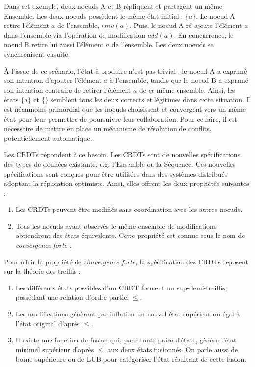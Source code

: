 \documentclass[12pt]{thesul}
\newcommand{\eg}{e.g. }
\newcommand{\trm}[1]{\mathit{#1}}
\begin{document}
Dans cet exemple, deux noeuds A et B répliquent et partagent un même Ensemble.
Les deux noeuds possèdent le même état initial : $\{a\}$.
Le noeud A retire l'élément $a$ de l'ensemble, $\trm{rmv}(a)$.
Puis, le noeud A ré-ajoute l'élément $a$ dans l'ensemble via l'opération de modification $\trm{add}(a)$.
En concurrence, le noeud B retire lui aussi l'élément $a$ de l'ensemble.
Les deux noeuds se synchronisent ensuite.

À l'issue de ce scénario, l'état à produire n'est pas trivial : le noeud A a exprimé son intention d'ajouter l'élément $a$ à l'ensemble, tandis que le noeud B a exprimé son intention contraire de retirer l'élément $a$ de ce même ensemble.
Ainsi, les états $\{a\}$ et $\{\}$ semblent tous les deux corrects et légitimes dans cette situation.
Il est néanmoins primordial que les noeuds choisissent et convergent vers un même état pour leur permettre de poursuivre leur collaboration.
Pour ce faire, il est nécessaire de mettre en place un mécanisme de résolution de conflits, potentiellement automatique.

Les \acp{CRDT} répondent à ce besoin.
Les \acp{CRDT} sont de nouvelles spécifications des types de données existants, \eg l'Ensemble ou la Séquence.
Ces nouvelles spécifications sont conçues pour être utilisées dans des systèmes distribués adoptant la réplication optimiste.
Ainsi, elles offrent les deux propriétés suivantes :

\begin{enumerate}[label=(\roman*)]
  \item Les \acp{CRDT} peuvent être modifiés sans coordination avec les autres noeuds.
  \item Tous les noeuds ayant observés le même ensemble de modifications obtiendront des états équivalents.
    Cette propriété est connue sous le nom de \emph{convergence forte} .
\end{enumerate}

Pour offrir la propriété de \emph{convergence forte}, la spécification des \acp{CRDT} reposent sur la théorie des treillis :

\begin{enumerate}[label=(\roman*)]
  \item Les différents états possibles d'un \ac{CRDT} forment un sup-demi-treillis, possédant une relation d'ordre partiel $\leq$.
  \item Les modifications génèrent par inflation un nouvel état supérieur ou égal à l'état original d'après $\leq$.
  \item \label{item:lub} Il existe une fonction de fusion qui, pour toute paire d'états, génère l'état minimal supérieur d'après $\leq$ aux deux états fusionnés.
  On parle aussi de borne supérieure ou de \ac{LUB} pour catégoriser l'état résultant de cette fusion.
\end{enumerate}
\end{document}
